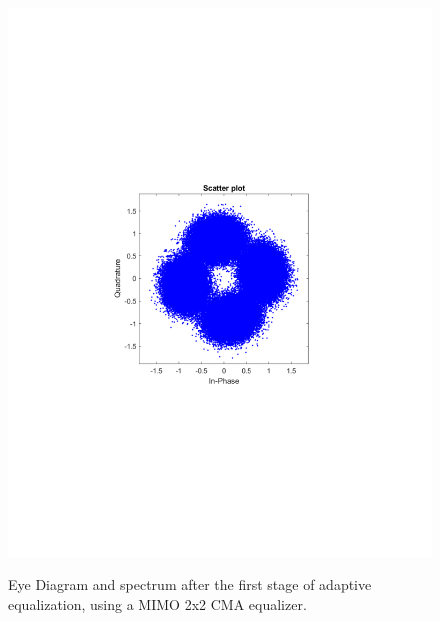 \begin{refsection}
\begin{figure}[H]
\begin{minipage}{0.30\textwidth}
		\includegraphics[clip, trim=4cm 8cm 4cm 8cm, width=1\textwidth]{./sdf/m_qam_system/figures/expResults/homodyne/3_const_16GBdInSig13dB_AfMIMO1.pdf}
		\label{fig:16GBdSpecBefFec}
	\end{minipage}
	\caption{Eye Diagram and spectrum after the first stage of adaptive equalization, using a MIMO 2x2 CMA equalizer.}
\end{figure}



\end{refsection}

